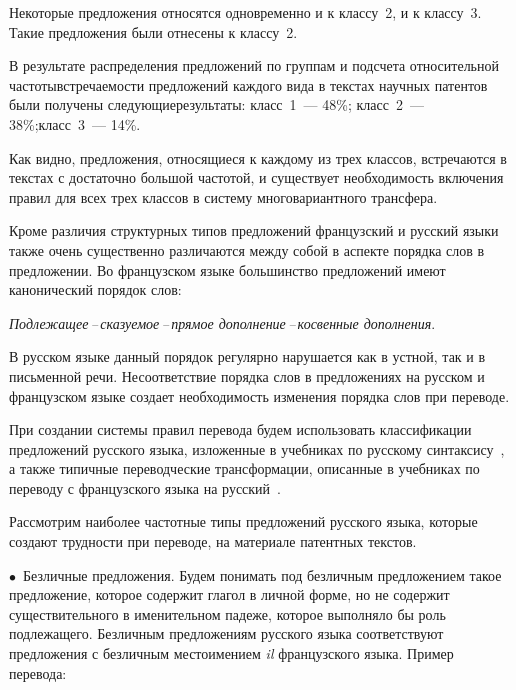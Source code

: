 \begin{multicols}{2}
     Некоторые предложения относятся одновременно и к классу~2, и к 
классу~3. Такие предложения были отнесены к классу~2.
     
     В результате распределения предложений по груп\-пам и подсчета 
относительной частоты\linebreak встречаемости предложений каждого вида в текс\-тах 
на\-уч\-ных патентов были получены следующие\linebreak результаты:
     класс~1~--- 48\%; класс~2~--- 38\%;\linebreak класс~3~--- 14\%.
     
     Как видно, предложения, относящиеся к каж\-до\-му из трех классов, 
встречаются в текстах с достаточно большой частотой, и существует 
необходимость включения правил для всех трех классов в сис\-те\-му 
многовариантного трансфера.
       
     Кроме различия структурных типов предложений французский и 
русский языки также очень существенно различаются между собой в аспекте 
порядка слов в предложении. Во французском языке большинство 
предложений имеют канонический порядок слов:
       
\begin{center}
 \textit{Подлежащее\,--\,сказуемое\,--\,прямое дополнение\,--\,косвенные 
дополнения}.
\end{center}
     
     В русском языке данный порядок регулярно нарушается как в устной, 
так и в письменной речи. Несоответствие порядка слов в предложениях на 
русском и французском языке создает необходимость изменения порядка 
слов при переводе. 
     
     При создании сис\-те\-мы правил перевода будем использовать 
классификации предложений русского языка, изложенные в учебниках по 
русскому синтаксису~\cite{16-mor, 17-mor}, а также типичные переводческие 
трансформации, описанные в учебниках по переводу с французского языка 
на русский~\cite{18-mor}.
     
     Рассмотрим наиболее частотные типы предложений русского языка, 
которые создают трудности при переводе, на материале патентных текстов.

$\bullet$~Безличные предложения. Будем понимать под безличным 
предложением такое предложение, которое содержит глагол в личной форме, 
но не содержит существительного в именительном падеже, которое 
выполняло бы роль подлежащего. Безличным предложениям русского языка 
соответствуют предложения с безличным местоимением \textit{il} 
французского языка. Пример перевода:


\end{multicols}
